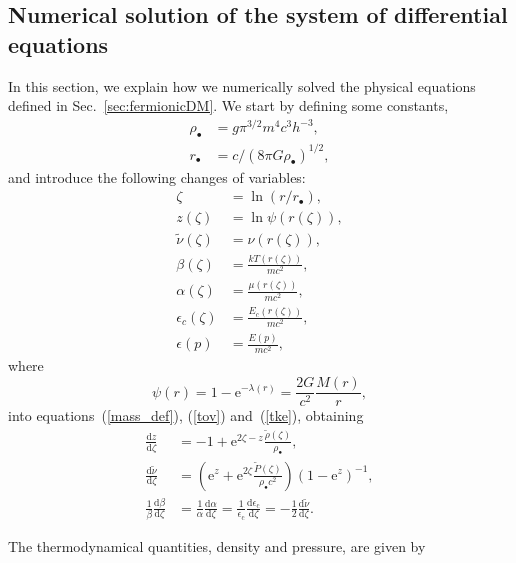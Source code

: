 \documentclass[referee]{aa} %
\begin{document}
\begin{appendix}
\section{Numerical solution of the system of differential equations}
\label{app:numerical}
In this section, we explain how we numerically solved the physical equations defined in Sec.~\ref{sec:fermionicDM}.
We start by defining some constants,
\begin{align}
    \rho_{\bullet}&= g\pi^{3/2} m^4 c^3 h^{-3},\\
    r_\bullet &= c/(8\pi G \rho_\bullet)^{1/2},
\end{align}
and introduce the following changes of variables:
\begin{align}
   \zeta &= \ln(r/r_\bullet),\\
   z(\zeta) &=\ln\psi(r(\zeta)),\\
   \tilde{\nu}(\zeta) &=\nu(r(\zeta)),\\
   \beta(\zeta)&=\frac{kT(r(\zeta))}{mc^2},\\
   \alpha(\zeta)&=\frac{\mu(r(\zeta))}{mc^2},\\
   \epsilon_c(\zeta)&=\frac{E_c(r(\zeta))}{mc^2},\\
   \epsilon(p)&=\frac{E(p)}{mc^2},
\end{align}
where
\begin{equation}
    \psi(r) = 1-\textrm{e}^{-\lambda(r)} = \frac{2G}{c^2}\frac{M(r)}{r},
    \label{mass_dm}
\end{equation}
into equations~(\ref{mass_def}), (\ref{tov}) and~(\ref{tke}), obtaining
\begin{align}
   \label{sode}
   \frac{\mathrm{d}z}{\mathrm{d}\zeta} & = -1+\mathrm{e}^{2\zeta-z}\frac{\tilde{\rho}(\zeta)}{\rho_{\bullet}},\\
   \label{sode2}
   \frac{\mathrm{d}\tilde{\nu}}{\mathrm{d}\zeta} & = \left(\mathrm{e}^{z}+\mathrm{e}^{2\zeta}\frac{\tilde{P}(\zeta)}{\rho_{\bullet}c^2}\right)(1-\mathrm{e}^{z})^{-1},\\
   \frac{1}{\beta}\frac{\mathrm{d}\beta}{\mathrm{d}\zeta}&=\frac{1}{\alpha}\frac{\mathrm{d}\alpha}{\mathrm{d}\zeta}=
   \frac{1}{\epsilon_\mathrm{c}}\frac{\mathrm{d} \epsilon_\mathrm{c}}{\mathrm{d}\zeta}=-\frac{1}{2}\frac{\mathrm{d}\tilde{\nu}}{\mathrm{d}\zeta}.\label{tke2}
\end{align}


The thermodynamical quantities, density and pressure, are given by


\end{appendix}
\end{document}
